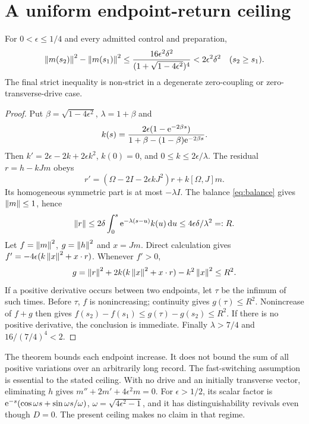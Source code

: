 \documentclass[11pt]{article}
\begin{document}
\section{A uniform endpoint-return ceiling}
\begin{theorem}\label{thm:ceiling}
For $0<\epsilon\leq1/4$ and every admitted control and preparation,
\[
 \left\lVert m(s_2)\right\rVert^2-\left\lVert m(s_1)\right\rVert^2
 \leq\frac{16\epsilon^2\delta^2}
 {(1+\sqrt{1-4\epsilon^2})^4}
 <2\epsilon^2\delta^2
 \quad(s_2\geq s_1).
\]
The final strict inequality is non-strict in a degenerate zero-coupling
or zero-transverse-drive case.
\end{theorem}
\begin{proof}
Put $\beta=\sqrt{1-4\epsilon^2}$, $\lambda=1+\beta$ and
\[
 k(s)=
 \frac{2\epsilon(1-\mathrm e^{-2\beta s})}
 {1+\beta-(1-\beta)\mathrm e^{-2\beta s}} .
\]
Then $k'=2\epsilon-2k+2\epsilon k^2$, $k(0)=0$,
and $0\leq k\leq2\epsilon/\lambda$.
The residual $r=h-kJm$ obeys
\[
 r'=(\Omega-2I-2\epsilon kJ^2)r+k[\Omega,J]m .
\]
Its homogeneous symmetric part is at most $-\lambda I$.
The balance \eqref{eq:balance} gives $\left\lVert m\right\rVert\leq1$, hence
\[
 \left\lVert r\right\rVert\leq2\delta\int_0^s\mathrm e^{-\lambda(s-u)}k(u)\,\mathrm d u
 \leq4\epsilon\delta/\lambda^2=:R.
\]
Let $f=\left\lVert m\right\rVert^2$, $g=\left\lVert h\right\rVert^2$ and $x=Jm$. Direct calculation gives
$f'=-4\epsilon(k\left\lVert x\right\rVert^2+x\cdot r)$.
Whenever $f'>0$,
\[
 g=\left\lVert r\right\rVert^2+2k(k\left\lVert x\right\rVert^2+x\cdot r)-k^2\left\lVert x\right\rVert^2\leq R^2.
\]
If a positive derivative occurs between two endpoints, let $\tau$ be the
infimum of such times. Before $\tau$, $f$ is nonincreasing; continuity
gives $g(\tau)\leq R^2$. Nonincrease of $f+g$ then gives
$f(s_2)-f(s_1)\leq g(\tau)-g(s_2)\leq R^2$.
If there is no positive derivative, the conclusion is immediate.
Finally $\lambda>7/4$ and $16/(7/4)^4<2$.
\end{proof}
The theorem bounds each endpoint increase. It does not bound the sum of
all positive variations over an arbitrarily long record.
The fast-switching assumption is essential to the stated ceiling. With no
drive and an initially transverse vector, eliminating $h$ gives
$m''+2m'+4\epsilon^2m=0$. For $\epsilon>1/2$, its scalar factor is
$\mathrm e^{-s}(\cos\omega s+\sin\omega s/\omega)$,
$\omega=\sqrt{4\epsilon^2-1}$, and it has distinguishability revivals even
though $D=0$. The present ceiling makes no claim in that regime.
\end{document}
